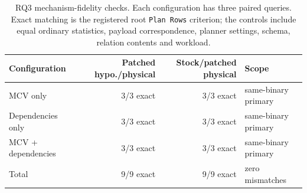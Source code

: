 \begin{table}[t]
\centering
\scriptsize
\caption{RQ3 mechanism-fidelity checks. Each configuration has three paired
queries. Exact matching is the registered root \texttt{Plan Rows} criterion;
the controls include equal ordinary statistics, payload correspondence,
planner settings, schema, relation contents and workload.}
\label{tab:rq3-fidelity}
\begin{tabular}{lrrl}
\toprule
Configuration & Patched hypo./physical & Stock/patched physical & Scope \\
\midrule
MCV only & 3/3 exact & 3/3 exact & same-binary primary \\
Dependencies only & 3/3 exact & 3/3 exact & same-binary primary \\
MCV + dependencies & 3/3 exact & 3/3 exact & same-binary primary \\
\midrule
Total & 9/9 exact & 9/9 exact & zero mismatches \\
\bottomrule
\end{tabular}
\end{table}
